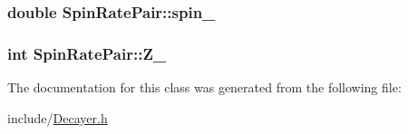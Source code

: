 \hypertarget{classSpinRatePair_ab52ca1bd083db60ceaf8fe58b4647669}{
\subsubsection[{spin\-\_\-}]{\setlength{\rightskip}{0pt plus 5cm}double Spin\-Rate\-Pair\-::spin\-\_\-}}\label{classSpinRatePair_ab52ca1bd083db60ceaf8fe58b4647669}
\hypertarget{classSpinRatePair_abcfea082d53a68d433b3deac710f1731}{
\subsubsection[{Z\-\_\-}]{\setlength{\rightskip}{0pt plus 5cm}int Spin\-Rate\-Pair\-::\-Z\-\_\-}}\label{classSpinRatePair_abcfea082d53a68d433b3deac710f1731}


The documentation for this class was generated from the following file\-:\begin{DoxyCompactItemize}
\item 
include/\hyperlink{Decayer_8h}{Decayer.\-h}\end{DoxyCompactItemize}
